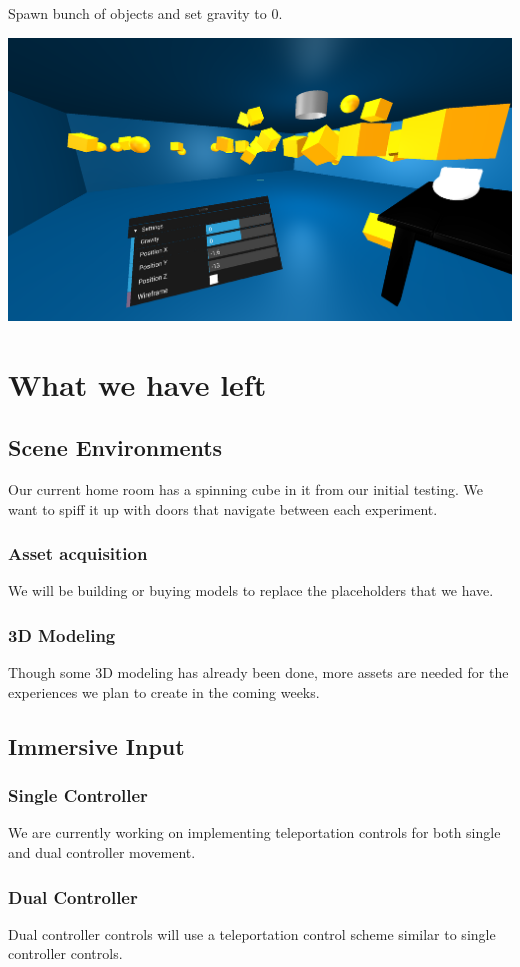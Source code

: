 \documentclass[onecolumn, draftclsnofoot,10pt, compsoc]{IEEEtran}
\begin{document}
   Spawn bunch of objects and set gravity to 0.
   
   \includegraphics[width=\linewidth]{images/menu-gui-gravity.png}
    
\section{What we have left}
\subsection{Scene Environments}
Our current home room has a spinning cube in it from our initial testing.  We want to spiff it up with doors that navigate between each experiment.
\subsubsection{Asset acquisition}
We will be building or buying models to replace the placeholders that we have.
\subsubsection{3D Modeling}
Though some 3D modeling has already been done, more assets are needed for the experiences we plan to create in the coming weeks.
\subsection{Immersive Input}
\subsubsection{Single Controller}
We are currently working on implementing teleportation controls for both single and dual controller movement.
\subsubsection{Dual Controller}
Dual controller controls will use a teleportation control scheme similar to single controller controls.
\end{document}
